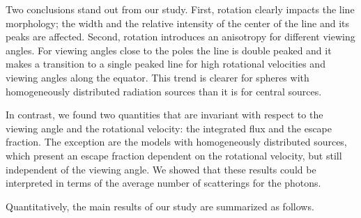 \documentclass{emulateapj}
\newcommand{\ly}{{\ifmmode{{\rm Ly}\alpha~}\else{Ly$\alpha$~}\fi}}
\begin{document}
Two conclusions stand out from our study. First, rotation clearly impacts the \ly line
morphology; the width and the relative intensity of the center of the
line and its peaks are affected. Second, rotation introduces an
anisotropy for different viewing angles. For viewing angles close to
the poles the line is double peaked and it makes a transition to a
single peaked line for high rotational velocities and viewing angles
along the equator. This trend is clearer for spheres with
homogeneously distributed radiation sources than it is for central
sources.     


In contrast, we found two quantities that are invariant with respect
to the viewing angle and the rotational velocity: the integrated flux and the escape
fraction.  The exception are the models with homogeneously distributed
sources, which present an escape fraction dependent on the rotational
velocity, but still independent of the viewing angle. We showed that
these results could be interpreted in terms of the average number of
scatterings for the photons.


Quantitatively, the main results of our study are summarized as
follows. 
\end{document}
